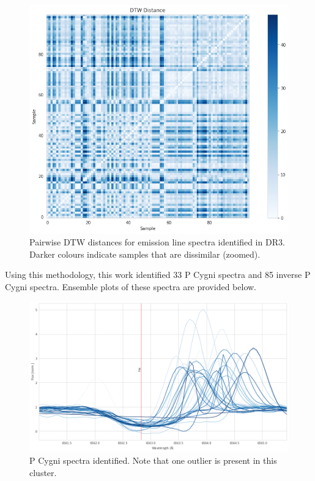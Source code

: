 \begin{figure}[!htb]
\centering
\includegraphics[scale=0.60]{figures/dtw distances dr3 zoomed.png}
\caption{Pairwise DTW distances for emission line spectra identified in DR3. Darker colours indicate samples that are dissimilar (zoomed).}
\end{figure}

Using this methodology, this work identified 33 P Cygni spectra and 85 inverse P Cygni spectra. Ensemble plots of these spectra are provided below.

\begin{figure}[!htb]
\centering
\includegraphics[scale=0.45]{figures/p cygni ensemble.png}
\caption{P Cygni spectra identified. Note that one outlier is present in this cluster.}
\end{figure}

